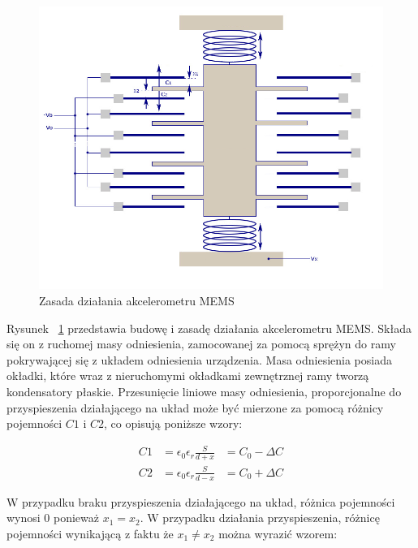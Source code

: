 \begin{figure}[H]
	\centering
	\includegraphics[scale=0.4]{Pictures/MEMS-Accelerometer_struct.png}
		\caption[Zasada działania akcelerometru MEMS]{Zasada działania akcelerometru MEMS}
	\label{fig:MEMS-Accelerometer_struct}
\end{figure}

Rysunek ~\ref{fig:MEMS-Accelerometer_struct} przedstawia budowę i zasadę działania akcelerometru MEMS. Składa się on z ruchomej masy odniesienia, zamocowanej za pomocą sprężyn do ramy pokrywającej się z układem odniesienia urządzenia. Masa odniesienia posiada okładki, które wraz z nieruchomymi okładkami zewnętrznej ramy tworzą kondensatory płaskie. Przesunięcie liniowe masy odniesienia, proporcjonalne do przyspieszenia działającego na układ może być mierzone za pomocą różnicy pojemności $C1$ i $C2$, co opisują poniższe wzory:

\begin{equation}
\begin{aligned}
C1 &= \epsilon_0\epsilon_r\frac{S}{d + x} &= C_0 - \Delta{C} \\
C2 &= \epsilon_0\epsilon_r\frac{S}{d - x} &= C_0 + \Delta{C}
\end{aligned}
\label{C_to_delta}
\end{equation} 

W przypadku braku przyspieszenia działającego na układ, różnica pojemności wynosi $0$ ponieważ $x_1 = x_2$. W przypadku działania przyspieszenia, różnicę pojemności wynikającą z faktu że $x_1 \neq x_2$ można wyrazić wzorem:

